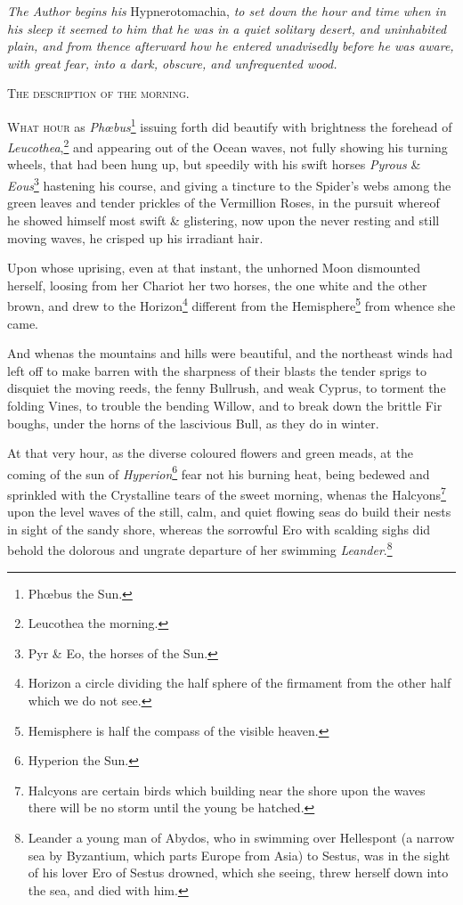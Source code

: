 \documentclass[12pt]{book}
\begin{document}
{\large\noindent\textit{The Author begins his} Hypnerotomachia, \textit{to set
  down the hour and time when in his sleep it seemed to him that
  he was in a quiet solitary desert, and uninhabited plain, and
  from thence afterward how he entered unadvisedly before he was
  aware, with great fear, into a dark, obscure, and unfrequented
  wood.}}

\begin{center}
  \textsc{The description of the morning.}
\end{center}

\lettrine[lines=5, loversize=0.1, findent=5pt, nindent=0em, image=true]{W}{hat hour} as \textit{Phœbus}\footnote{Phœbus the Sun.} issuing
forth did beautify with brightness the forehead of
\textit{Leucothea},\footnote{Leucothea the morning.} and appearing out
of the Ocean waves, not fully showing his turning wheels, that had
been hung up, but speedily with his swift horses \textit{Pyrous} \&
\textit{Eous}\footnote{Pyr \& Eo, the horses of the Sun.} hastening
his course, and giving a tincture to the Spider’s webs among the
green leaves and tender prickles of the Vermillion Roses, in the
pursuit whereof he showed himself most swift \& glistering, now upon
the never resting and still moving waves, he crisped up his irradiant
hair.

Upon whose uprising, even at that instant, the unhorned Moon
dismounted herself, loosing from her Chariot her two horses, the one
white and the other brown, and drew to the Horizon\footnote{Horizon
  a circle dividing the half sphere of the firmament from the other
  half which we do not see.} different from the
Hemisphere\footnote{Hemisphere is half the compass of the visible
  heaven.} from whence she came.

And whenas the mountains and hills were beautiful, and the
northeast winds had left off to make barren with the sharpness of
their blasts the tender sprigs to disquiet the moving reeds, the
fenny Bullrush, and weak Cyprus, to torment the folding Vines, to
trouble the bending Willow, and to break down the brittle Fir
boughs, under the horns of the lascivious Bull, as they do in
winter.

At that very hour, as the diverse coloured flowers and green meads,
at the coming of the sun of \textit{Hyperion}\footnote{Hyperion the Sun.}
fear not his burning heat, being bedewed and sprinkled with the
Crystalline tears of the sweet morning, whenas the
Halcyons\footnote{Halcyons are certain birds which building near the
  shore upon the waves there will be no storm until the young be
  hatched.} upon the level waves of the still, calm, and quiet
flowing seas do build their nests in sight of the sandy shore,
whereas the sorrowful Ero with scalding sighs did behold the
dolorous and ungrate departure of her swimming
\textit{Leander}.\footnote{Leander a young man of Abydos, who in swimming over
  Hellespont (a narrow sea by Byzantium, which parts Europe from Asia)
  to Sestus, was in the sight of his lover Ero of Sestus drowned,
  which she seeing, threw herself down into the sea, and died with
  him.}
\end{document}
